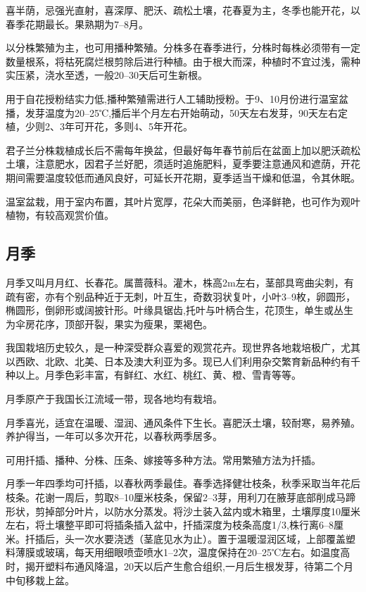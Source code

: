 \documentclass{ctexbook}
\begin{document}
喜半荫，忌强光直射，喜深厚、肥沃、疏松土壤，花春夏为主，冬季也能开花，以春季花期最长。果熟期为7--8月。

以分株繁殖为主，也可用播种繁殖。分株多在春季进行，分株时每株必须带有一定数量根系，将枯死腐烂根剪除后进行种植。由于根大而深，种植时不宜过浅，需种实压紧，浇水至透，一般20--30天后可生新根。

用于自花授粉结实力低,播种繁殖需进行人工辅助授粉。于9、10月份进行温室盆播，发芽温度为20--25℃,播后半个月左右开始萌动，50天左右发芽，90天左右定植，少则2、3年可开花，多则4、5年开花。

君子兰分株栽植成长后不需每年换盆，但最好每年春节前后在盆面上加以肥沃疏松土壤，注意肥水，因君子兰好肥，须适时追施肥料，夏季要注意通风和遮荫，开花期间需要温度较低而通风良好，可延长开花期，夏季适当干燥和低温，令其休眠。

温室盆栽，用于室内布置，其叶片宽厚，花朵大而美丽，色泽鲜艳，也可作为观叶植物，有较高观赏价值。

\subsection{月季}
月季又叫月月红、长春花。属蔷薇科。灌木，株高2m左右，茎部具弯曲尖刺，有疏有密，亦有个别品种近于无刺，叶互生，奇数羽状复叶，小叶3--9枚，卵圆形，椭圆形，倒卵形或阔披针形。叶缘具锯齿,托叶与叶柄合生，花顶生，单生或丛生为伞房花序，顶部开裂，果实为瘦果，栗褐色。

我国栽培历史较久，是一种深受群众喜爱的观赏花卉。现世界各地栽培极广，尤其以西欧、北欧、北美、日本及澳大利亚为多。现已人们利用杂交繁育新品种约有千种以上。月季色彩丰富，有鲜红、水红、桃红、黄、橙、雪青等等。

月季原产于我国长江流域一带，现各地均有栽培。

月季喜光，适宜在温暖、湿润、通风条件下生长。喜肥沃土壤，较耐寒，易养殖。养护得当，一年可以多次开花，以春秋两季居多。

可用扦插、播种、分株、压条、嫁接等多种方法。常用繁殖方法为扦插。

月季一年四季均可扦插，以春秋两季最佳。春季选择健壮枝条，秋季采取当年花后枝条。花谢一周后，剪取8--10厘米枝条，保留2--3芽，用利刀在腋芽底部削成马蹄形状，剪掉部分叶片，以防水分蒸发。将沙土装入盆内或木箱里，土壤厚度10厘米左右，将土壤整平即可将插条插入盆中，扦插深度为枝条高度1/3,株行离6--8厘米。扦插后，头一次水要浇透（茎底见水为止）。置于温暖湿润区域，上部覆盖塑料薄膜或玻璃，每天用细眼喷壶喷水1--2次，温度保持在20--25℃左右。如温度高时，揭开塑料布通风降温，20天以后产生愈合组织,一月后生根发芽，待第二个月中旬移栽上盆。
\end{document}
